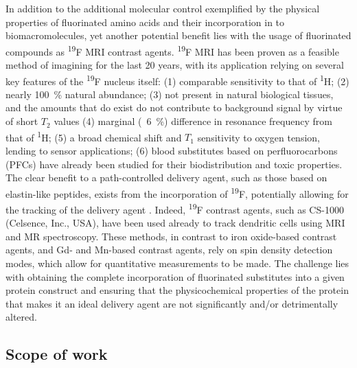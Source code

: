 \begin{refsection}
In addition to the additional molecular control exemplified by the physical
properties of fluorinated amino acids and their incorporation in to
biomacromolecules, yet another potential benefit lies with the usage of
fluorinated compounds as \textsuperscript{19}F MRI contrast agents.
\textsuperscript{19}F MRI has been proven as a feasible method of imagining for
the last 20 years,\cite{Srinivas2010,Nelson1985} with its application relying on
several key features of the \textsuperscript{19}F nucleus itself:
(1) comparable sensitivity to that of \textsuperscript{1}H;
(2) nearly \SI{100}{\percent} natural abundance;
(3) not present in natural biological tissues, and the amounts that do exist do
not contribute to background signal by virtue of short ${T_{2}}$ values
(4) marginal (~\SI{6}{\percent}) difference in resonance frequency from that of
\textsuperscript{1}H;
(5) a broad chemical shift and ${T_{1}}$ sensitivity to oxygen tension, lending
to  sensor applications; 
(6) blood substitutes based on perfluorocarbons (PFCs) have already been studied
for their biodistribution and toxic properties.
The clear benefit to a path-controlled delivery agent, such as those based on
elastin-like peptides, exists from the incorporation of \textsuperscript{19}F,
potentially allowing for the tracking of the delivery agent .
Indeed, \textsuperscript{19}F contrast agents, such as CS-1000 (Celsence, Inc.,
USA), have been used already to track dendritic cells  using MRI
and MR spectroscopy.\cite{Bonetto2010} These methods, in contrast to iron
oxide-based contrast agents, and Gd\pch[3]- and Mn\pch[2]-based contrast agents,
rely on spin density detection modes, which allow for quantitative measurements
to be made.\cite{Srinivas2010} The challenge lies with obtaining the complete
incorporation of fluorinated substitutes into a given protein construct and
ensuring that the physicochemical properties of the protein that makes it an
ideal delivery agent are not significantly and/or detrimentally altered.

\subsection{Scope of work}


\end{refsection}
